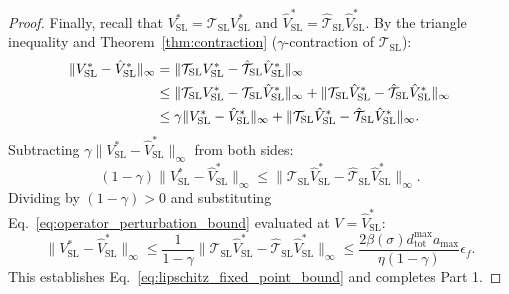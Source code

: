 \documentclass[11pt,a4paper]{article}
\begin{document}
\begin{proof}
Finally, recall that $V_{\text{SL}}^* = \mathcal{T}_{\text{SL}} V_{\text{SL}}^*$ and $\hat{V}_{\text{SL}}^* = \hat{\mathcal{T}}_{\text{SL}} \hat{V}_{\text{SL}}^*$. By the triangle inequality and Theorem~\ref{thm:contraction} ($\gamma$-contraction of $\mathcal{T}_{\text{SL}}$):
\begin{align}
\|V_{\text{SL}}^* - \hat{V}_{\text{SL}}^*\|_\infty &= \|\mathcal{T}_{\text{SL}} V_{\text{SL}}^* - \hat{\mathcal{T}}_{\text{SL}} \hat{V}_{\text{SL}}^*\|_\infty \notag \\
&\le \|\mathcal{T}_{\text{SL}} V_{\text{SL}}^* - \mathcal{T}_{\text{SL}} \hat{V}_{\text{SL}}^*\|_\infty + \|\mathcal{T}_{\text{SL}} \hat{V}_{\text{SL}}^* - \hat{\mathcal{T}}_{\text{SL}} \hat{V}_{\text{SL}}^*\|_\infty \notag \\
&\le \gamma \|V_{\text{SL}}^* - \hat{V}_{\text{SL}}^*\|_\infty + \|\mathcal{T}_{\text{SL}} \hat{V}_{\text{SL}}^* - \hat{\mathcal{T}}_{\text{SL}} \hat{V}_{\text{SL}}^*\|_\infty.
\end{align}
Subtracting $\gamma \|V_{\text{SL}}^* - \hat{V}_{\text{SL}}^*\|_\infty$ from both sides:
\begin{equation}
(1 - \gamma) \|V_{\text{SL}}^* - \hat{V}_{\text{SL}}^*\|_\infty \le \|\mathcal{T}_{\text{SL}} \hat{V}_{\text{SL}}^* - \hat{\mathcal{T}}_{\text{SL}} \hat{V}_{\text{SL}}^*\|_\infty.
\end{equation}
Dividing by $(1 - \gamma) > 0$ and substituting Eq.~\eqref{eq:operator_perturbation_bound} evaluated at $V = \hat{V}_{\text{SL}}^*$:
\begin{equation}
\|V_{\text{SL}}^* - \hat{V}_{\text{SL}}^*\|_\infty \le \frac{1}{1 - \gamma} \|\mathcal{T}_{\text{SL}} \hat{V}_{\text{SL}}^* - \hat{\mathcal{T}}_{\text{SL}} \hat{V}_{\text{SL}}^*\|_\infty \le \frac{2 \beta(\sigma) d_{\text{tot}}^{\max} a_{\max}}{\eta (1 - \gamma)} \epsilon_f.
\end{equation}
This establishes Eq.~\eqref{eq:lipschitz_fixed_point_bound} and completes Part 1.


\end{proof}
\end{document}
